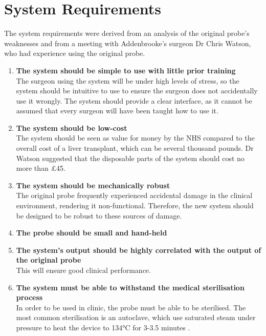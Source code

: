 \section{System Requirements}

The system requirements were derived from an analysis of the original probe's weaknesses and from a meeting with Addenbrooke's surgeon Dr Chris Watson, who had experience using the original probe.


\begin{enumerate}
\item \label{req: simple} \textbf{The system should be simple to use with little prior training}\\
The surgeon using the system will be under high levels of stress, so the system should be intuitive to use to ensure the surgeon does not accidentally use it wrongly. The system should provide a clear interface, as it cannot be assumed that every surgeon will have been taught how to use it.

\item \label{req: cheap} \textbf{The system should be low-cost}\\
The system should be seen as value for money by the NHS compared to the overall cost of a liver transplant, which can be several thousand pounds. Dr Watson suggested that the disposable parts of the system should cost no more than £45.

\item \label{req: robust} \textbf{The system should be mechanically robust}\\
The original probe frequently experienced accidental damage in the clinical environment, rendering it non-functional. Therefore, the new system should be designed to be robust to these sources of damage.

\item \label{req: small} \textbf{The probe should be small and hand-held}\\



\item \label{req: correlation} \textbf{The system's output should be highly correlated with the output of the original probe}\\
This will ensure good clinical performance.



\item \label{req: sterilise} \textbf{The system must be able to withstand the medical sterilisation process}\\
In order to be used in clinic, the probe must be able to be sterilised. The most common sterilisation is an autoclave, which use saturated steam under pressure to heat the device to 134\si{\celsius} for 3-3.5 minutes \cite{nhs_autoclave}.


\end{enumerate}
